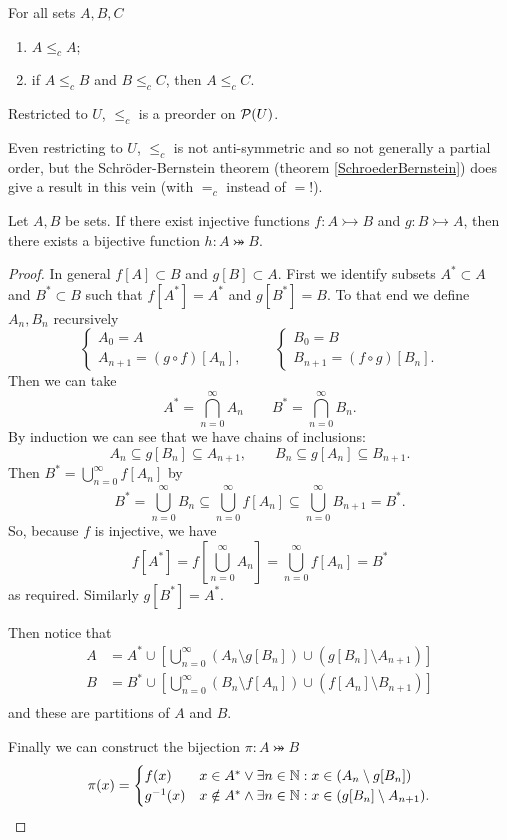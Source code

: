 \begin{proposition}
For all sets $A,B,C$
\begin{enumerate}
\item $A\leq_c A$;
\item if $A\leq_c B$ and $B\leq_c C$, then $A\leq_c C$.
\end{enumerate}
Restricted to $U$, $\leq_c$ is a preorder on $\operatorname{\mathcal{P}}(U)$.
\end{proposition}
Even restricting to $U$, $\leq_c$ is not anti-symmetric and so not generally a partial order, but the Schröder-Bernstein theorem (theorem \ref{SchroederBernstein}) does give a result in this vein (with $=_c$ instead of $=$!).

\begin{theorem} \label{SchroederBernstein}
Let $A, B$ be sets. If there exist injective functions $f: A\rightarrowtail B$ and $g: B\rightarrowtail A$, then there exists a bijective function $h: A\twoheadrightarrowtail B$.
\end{theorem}
\begin{proof}
In general $f[A]\subset B$ and $g[B]\subset A$. First we identify subsets $A^*\subset A$ and $B^*\subset B$ such that $f[A^*] = A^*$ and $g[B^*] = B$. To that end we define $A_n,B_n$ recursively
\[ \begin{cases}
A_0 = A \\ A_{n+1} = (g\circ f)[A_n],
\end{cases} \qquad \begin{cases}
B_0 = B \\ B_{n+1} = (f\circ g)[B_n].
\end{cases} \]
Then we can take
\[ A^* = \bigcap_{n=0}^\infty A_n \qquad B^* = \bigcap_{n=0}^\infty B_n. \]
By induction we can see that we have chains of inclusions:
\[ A_n\subseteq g[B_n] \subseteq A_{n+1}, \qquad B_n\subseteq g[A_n] \subseteq B_{n+1}. \]
Then $B^* = \bigcup_{n=0}^\infty f[A_n]$ by
\[ B^* = \bigcup_{n=0}^\infty B_n \subseteq \bigcup_{n=0}^\infty f[A_n]\subseteq \bigcup_{n=0}^\infty B_{n+1} = B^{*}. \]
So, because $f$ is injective, we have
\[ f[A^*] = f[\bigcup_{n=0}^\infty A_n] = \bigcup_{n=0}^\infty f[A_n] = B^* \]
as required. Similarly $g[B^*] = A^*$.

Then notice that
\begin{align*}
A &= A^* \cup \left[ \bigcup_{n=0}^\infty (A_n\setminus g[B_n])\cup (g[B_n]\setminus A_{n+1}) \right] \\
B &= B^* \cup \left[ \bigcup_{n=0}^\infty (B_n\setminus f[A_n])\cup (f[A_n]\setminus B_{n+1}) \right] \\
\end{align*}
and these are partitions of $A$ and $B$.

Finally we can construct the bijection $\pi: A\twoheadrightarrowtail B$
\[ \pi(x) = \begin{cases}
f(x) & x\in A^* \lor \exists n\in \mathbb{N}: x\in (A_n\setminus g[B_n]) \\
g^{-1}(x) & x\notin A^* \land \exists n\in \mathbb{N}: x\in (g[B_n]\setminus A_{n+1}).
\end{cases} \]
\end{proof}
